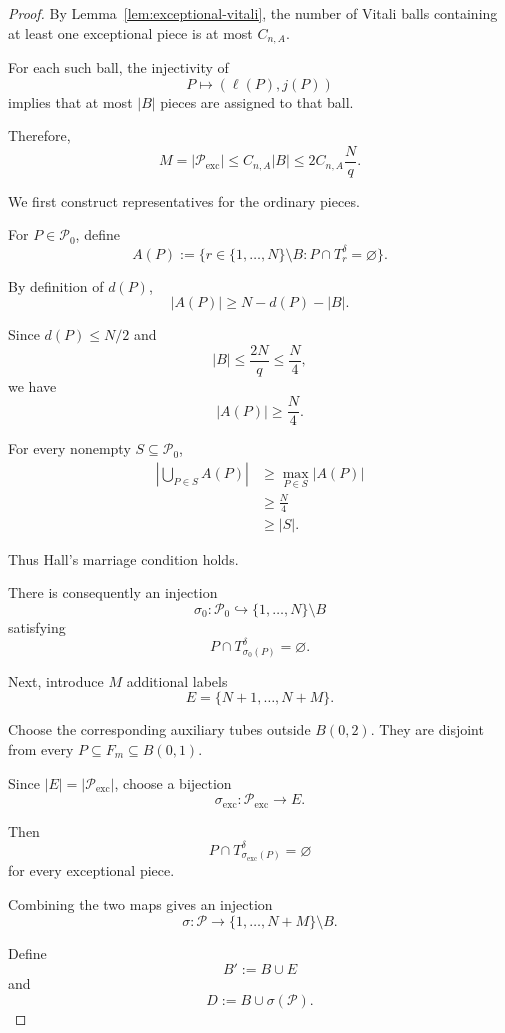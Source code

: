 \documentclass[11pt, letterpaper]{nyjm}
\begin{document}
	\begin{proof}
		By Lemma~\ref{lem:exceptional-vitali},
		the number of Vitali balls containing
		at least one exceptional piece is at
		most $C_{n,A}$.
		
		For each such ball, the injectivity of
		\[
		P\longmapsto(\ell(P),j(P))
		\]
		implies that at most $|B|$ pieces
		are assigned to that ball.
		
		Therefore,
		\[
		M=|\mathcal P_{\mathrm{exc}}|
		\le C_{n,A}|B|
		\le 2C_{n,A}\frac Nq.
		\]
		
		We first construct representatives
		for the ordinary pieces.
		
		For $P\in\mathcal P_0$, define
		\[
		A(P):=
		\{r\in\{1,\ldots,N\}\setminus B:
		P\cap T_r^\delta=\varnothing\}.
		\]
		
		By definition of $d(P)$,
		\[
		|A(P)|\ge N-d(P)-|B|.
		\]
		
		Since $d(P)\le N/2$ and
		\[
		|B|\le\frac{2N}{q}\le\frac N4,
		\]
		we have
		\[
		|A(P)|\ge\frac N4.
		\]
		
		For every nonempty
		$S\subseteq\mathcal P_0$,
		\[
		\begin{aligned}
			\left|\bigcup_{P\in S}A(P)\right|
			&\ge\max_{P\in S}|A(P)|\\
			&\ge\frac N4\\
			&\ge|S|.
		\end{aligned}
		\]
		
		Thus Hall's marriage condition holds.
		
		There is consequently an injection
		\[
		\sigma_0:\mathcal P_0
		\hookrightarrow\{1,\ldots,N\}\setminus B
		\]
		satisfying
		\[
		P\cap T_{\sigma_0(P)}^\delta
		=\varnothing.
		\]
		
		Next, introduce $M$ additional labels
		\[
		E=\{N+1,\ldots,N+M\}.
		\]
		
		Choose the corresponding auxiliary
		tubes outside $B(0,2)$.
		They are disjoint from every
		$P\subseteq F_m\subseteq B(0,1)$.
		
		Since $|E|=|\mathcal P_{\mathrm{exc}}|$,
		choose a bijection
		\[
		\sigma_{\mathrm{exc}}:
		\mathcal P_{\mathrm{exc}}\longrightarrow E.
		\]
		
		Then
		\[
		P\cap T_{\sigma_{\mathrm{exc}}(P)}^\delta
		=\varnothing
		\]
		for every exceptional piece.
		
		Combining the two maps gives an injection
		\[
		\sigma:\mathcal P\longrightarrow
		\{1,\ldots,N+M\}\setminus B.
		\]
		
		Define
		\[
		B':=B\cup E
		\]
		and
		\[
		D:=B\cup\sigma(\mathcal P).
		\]
		

\end{proof}
\end{document}
